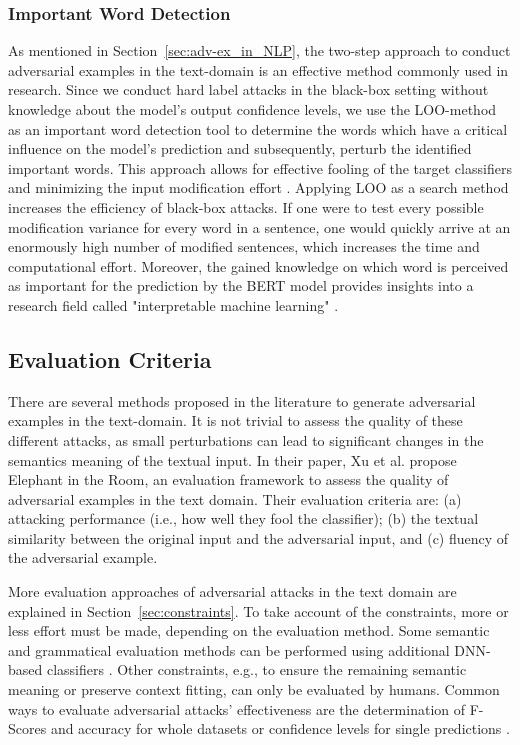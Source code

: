 \subsubsection{Important Word Detection}
\label{sec:iwd_method}
As mentioned in Section~\ref{sec:adv-ex_in_NLP}, the two-step approach to conduct adversarial examples in the text-domain is an effective method commonly used in research. Since we conduct hard label attacks in the black-box setting without knowledge about the model's output confidence levels, we use the LOO-method as an important word detection tool to determine the words which have a critical influence on the model's prediction and subsequently, perturb the identified important words. This approach allows for effective fooling of the target classifiers and minimizing the input modification effort \cite{jin2019bert}. Applying LOO as a search method increases the efficiency of black-box attacks. If one were to test every possible modification variance for every word in a sentence, one would quickly arrive at an enormously high number of modified sentences, which increases the time and computational effort. Moreover, the gained knowledge on which word is perceived as important for the prediction by the BERT model provides insights into a research field called "interpretable machine learning" \cite{doshi2017towards}.

\subsection{Evaluation Criteria}
    \label{sec:evaluation_tb}
There are several methods proposed in the literature to generate adversarial examples in the text-domain. It is not trivial to assess the quality of these different attacks, as small perturbations can lead to significant changes in the semantics meaning of the textual input. In their paper, Xu et al. propose Elephant in the Room, an evaluation framework to assess the quality of adversarial examples in the text domain\cite{xu2020elephant}. Their evaluation criteria are:
(a) attacking performance (i.e., how well they fool the classifier); 
(b) the textual similarity between the original input and the adversarial input, and
(c) fluency of the adversarial example.

More evaluation approaches of adversarial attacks in the text domain are explained in Section~\ref{sec:constraints}. To take account of the constraints, more or less effort must be made, depending on the evaluation method. Some semantic and grammatical evaluation methods can be performed using additional DNN-based classifiers \cite{ebrahimi2017hotflip, jin2019bert, garg2020bae}. Other constraints, e.g., to ensure the remaining semantic meaning or preserve context fitting, can only be evaluated by humans. 
Common ways to evaluate adversarial attacks' effectiveness are the determination of F-Scores and accuracy for whole datasets or confidence levels for single predictions \cite{DBLP:conf/ecir/GoutteG05}. 
\pagebreak
